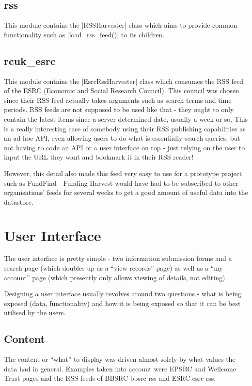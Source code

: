 \subsection{rss}
This module contains the |RSSHarvester| class which aims to provide common functionality such as |load_rss_feed()| to its children.

\subsection{rcuk\_esrc}
\label{design-rcuk-esrc}
This module contains the |EsrcRssHarvester| class which consumes the RSS feed of the ESRC (Economic and Social Research Council). This council was chosen since their RSS feed \cite{esrc-rss} actually takes arguments such as search terms and time periods. RSS feeds are not supposed to be used like that - they ought to only contain the latest items since a server-determined date, usually a week or so. This is a really interesting case of somebody using their RSS publishing capabilities as an ad-hoc API, even allowing users to do what is essentially search queries, but not having to code an API or a user interface on top - just relying on the user to input the URL they want and bookmark it in their RSS reader!

However, this detail also made this feed very easy to use for a prototype project such as FundFind - Funding Harvest would have had to be subscribed to other organisations' feeds for several weeks to get a good amount of useful data into the datastore.

\section{User Interface}

The user interface is pretty simple - two information submission forms and a search page (which doubles up as a ``view records'' page) as well as a ``my account'' page (which presently only allows viewing of details, not editing).

Designing a user interface usually revolves around two questions - what is being exposed (data, functionality) and how it is being exposed so that it can be best utilised by the users.

\subsection{Content}
The content or ``what'' to display was driven almost solely by what values the data had in general. Examples taken into account were EPSRC \cite{epsrc-example} and Wellcome Trust \cite{wellcome-example} pages and the RSS feeds of BBSRC {bbsrc-rss} and ESRC {esrc-rss}.

